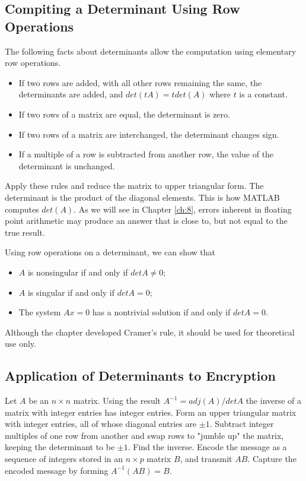 \documentclass[../main.tex]{subfiles}
\begin{document}
\subsection*{Compiting a Determinant Using Row Operations}
\noindent The following facts about determinants allow the computation using elementary row operations.
\begin{itemize}
  \item If two rows are added, with all other rows remaining the same, the determinants are added, and \(det (tA) = t det(A)\) where \(t\) is a constant.
  \item If two rows of a matrix are equal, the determinant is zero.
  \item If two rows of a matrix are interchanged, the determinant changes sign.
  \item If a multiple of a row is subtracted from another row, the value of the determinant is unchanged.
\end{itemize}

Apply these rules and reduce the matrix to upper triangular form. The determinant is the product of the diagonal elements. This is how MATLAB computes \(det(A)\). As we will see in Chapter \ref{ch:8}, errors inherent in floating point arithmetic may produce an answer that is close to, but not equal to the true result.

Using row operations on a determinant, we can show that\begin{itemize}
  \item \(A\) is nonsingular if and only if \(detA \neq 0\);
  \item \(A\) is singular if and only if \(detA = 0\);
  \item The system \(Ax = 0\) has a nontrivial solution if and only if \(detA = 0\).
\end{itemize}
Although the chapter developed Cramer's rule, it should be used for theoretical use only.

\subsection*{Application of Determinants to Encryption}
Let \(A\) be an \(n \times n\) matrix. Using the result \(A^{-1} = adj(A)/detA\) the inverse of a matrix with integer entries has integer entries. Form an upper triangular matrix with integer entries, all of whose diagonal entries are \(\pm1\). Subtract integer multiples of one row from another and swap rows to "jumble up" the matrix, keeping the determinant to be \(\pm1\). Find the inverse. Encode the message as a sequence of integers stored in an \(n \times p\) matrix \(B\), and transmit \(AB\). Capture the encoded message by forming \(A^{-1}(AB) = B\).
\end{document}
